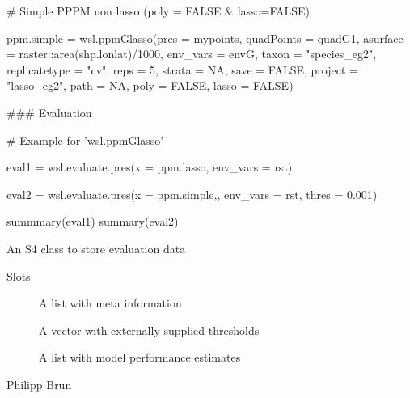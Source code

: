 \documentclass[a4paper]{book}
\begin{document}
\begin{Examples}
\begin{ExampleCode}
       # Simple PPPM non lasso (poly = FALSE & lasso=FALSE)

ppm.simple = wsl.ppmGlasso(pres = mypoints,
                       quadPoints = quadG1,
                       asurface = raster::area(shp.lonlat)/1000,
                       env_vars = envG,
                       taxon = "species_eg2",
                       replicatetype = "cv",
                       reps = 5,
                       strata = NA,
                       save = FALSE,
                       project = "lasso_eg2",
                       path = NA,
                       poly = FALSE,
                       lasso = FALSE)

### Evaluation

   # Example for 'wsl.ppmGlasso'

eval1 = wsl.evaluate.pres(x = ppm.lasso,
                          env_vars = rst)

eval2 = wsl.evaluate.pres(x = ppm.simple,,
                          env_vars = rst,
                          thres = 0.001)

summmary(eval1)
summary(eval2)

\end{ExampleCode}
\end{Examples}
%
\begin{Description}\relax
An S4 class to store evaluation data
\end{Description}
%
\begin{Section}{Slots}

\begin{description}

\item[] A list with meta information

\item[] A vector with externally supplied thresholds

\item[] A list with model performance estimates

\end{description}
\end{Section}
%
\begin{Author}\relax
Philipp Brun
\end{Author}
\end{document}
